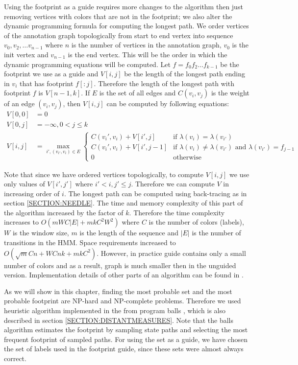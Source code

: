 Using the footprint as a guide requires more changes to the algorithm then just
removing vertices with colors that are not in the footprint; we also alter the
dynamic programming formula for computing the longest path.  We order vertices
of the annotation graph topologically from start to end vertex into sequence
$v_0, v_2, \dots v_{n-1}$ where $n$ is the number of vertices in the annotation
graph, $v_0$ is the init vertex and $v_{n-1}$ is the end vertex.  This will be
the order in which the dynamic programming equations will be computed.  Let
$f=f_0f_2\dots f_{k-1}$ be the footprint we use as a guide and $V[i, j]$ be the
length of the longest path ending in $v_i$ that has footprint $f[:j]$.
Therefore the length of the longest path with footprint $f$ is $V[n - 1, k]$.
If $E$ is the set of all edges and $C(v_i, v_j)$ is the weight of an edge
$(v_i, v_j)$, then $V[i, j]$ can be computed by following equations: 
\begin{align} 
V[0, 0] &= 0 \\ V[0, j] &= -\infty, 0< j \leq k \\
V[i, j] &= \max_{i', (v_{i'}, v_i)\in E} 
\begin{cases} 
C(v_i', v_i) + V[i', j]& \text{if $\lambda(v_i) = \lambda(v_{i'})$}\\
C(v_i', v_i) + V[i', j-1]& \text{if $\lambda(v_i) \not= \lambda(v_{i'})$ and $\lambda(v_{i'})=f_{j-1}$}\\
0 & \text{otherwise} 
\end{cases} 
\end{align}

Note that since we have ordered vertices topologically, to compute $V[i, j]$ we
use only values of $V[i', j']$ where $i'< i, j'\leq j$. Therefore we can compute
$V$ in increasing order of $i$. The longest path can be computed using
back-tracing as in section \ref{SECTION:NEEDLE}. The time and memory complexity 
of this part of the algorithm increased by the factor of $k$. Therefore the
time complexity increases to $O(mWC|E|+mkC^2W^2)$ where $C$ is the number of
colors (labels), $W$ is the window size, $m$ is the length of the sequence and
$|E|$ is the number of transitions in the HMM.  Space requirements increased to
$O(\sqrt{m}Cn+WCnk+mkC^2)$. However, in practice guide contains only a small
number of colors and as a result, graph is much smaller then in the unguided
version. Implementation details of other parts of an algorithm can be found in
\cite{Nanasi2010mgr}.

As we will show in this chapter, finding the most probable set and the most
probable footprint are NP-hard and NP-complete problems.  Therefore we used
heuristic algorithm implemented in the from program balls \cite{Brown2010},
which is also described in section \ref{SECTION:DISTANTMEASURES}. Note that the
balls algorithm estimates the footprint by sampling state paths and selecting
the most frequent footprint of sampled paths. For using the set as a guide, we
have chosen the set of labels used in the footprint guide, since these sets
were almost always correct. 

